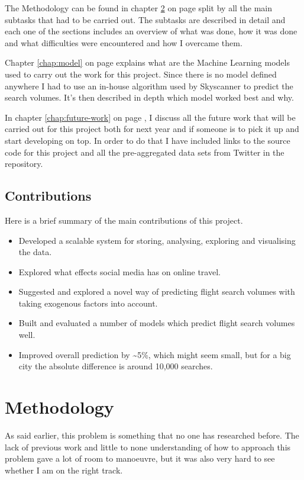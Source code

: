 \documentclass[minf,frontabs,twoside,singlespacing,parskip]{infthesis}
\begin{document}
The Methodology can be found in chapter \ref{chap:method} on page \pageref{chap:method} split by all the main subtasks that had to be carried out. The subtasks are described in detail and each one of the sections includes an overview of what was done, how it was done and what difficulties were encountered and how I overcame them. 


Chapter \ref{chap:model} on page \pageref{chap:model} explains what are the Machine Learning models used to carry out the work for this project. Since there is no model defined anywhere I had to use an in-house algorithm used by Skyscanner to predict the search volumes. It's then described in depth which model worked best and why. 


In chapter \ref{chap:future-work} on page \pageref{chap:future-work}, I discuss all the future work that will be carried out for this project both for next year and if someone is to pick it up and start developing on top. In order to do that I have included links to the source code for this project and all the pre-aggregated data sets from Twitter in the repository.

\section{Contributions}

Here is a brief summary of the main contributions of this project.
\begin{itemize}
\item Developed a scalable system for storing, analysing, exploring and visualising the data.
\item Explored what effects social media has on online travel.
\item Suggested and explored a novel way of predicting flight search volumes with taking exogenous factors into account.
\item Built and evaluated a number of models which predict flight search volumes well.
\item Improved overall prediction by \textasciitilde 5\%, which might seem small, but for a big city the absolute difference is around 10,000 searches.
\end{itemize}


\chapter{Methodology}
\label{chap:method}


As said earlier, this problem is something that no one has researched before. The lack of previous work and little to none understanding of how to approach this problem gave a lot of room to manoeuvre, but it was also very hard to see whether I am on the right track.
\end{document}
